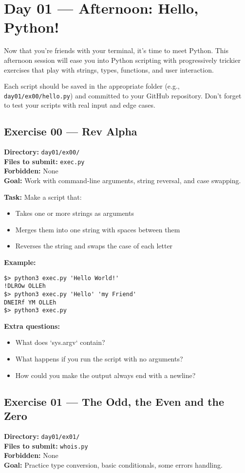 \documentclass[12pt,a4paper]{article}
\begin{document}
\newpage
\section{Day 01 — Afternoon: Hello, Python!}

Now that you're friends with your terminal, it's time to meet Python. This afternoon session will ease you into Python scripting with progressively trickier exercises that play with strings, types, functions, and user interaction.

Each script should be saved in the appropriate folder (e.g., \texttt{day01/ex00/hello.py}) and committed to your GitHub repository. Don't forget to test your scripts with real input and edge cases.

\newpage
\subsection*{Exercise 00 — Rev Alpha}
\textbf{Directory:} \texttt{day01/ex00/}\\
\textbf{Files to submit:} \texttt{exec.py}\\
\textbf{Forbidden:} None\\
\textbf{Goal:} Work with command-line arguments, string reversal, and case swapping.

\textbf{Task:} Make a script that:
\begin{itemize}
  \item Takes one or more strings as arguments
  \item Merges them into one string with spaces between them
  \item Reverses the string and swaps the case of each letter
\end{itemize}

\textbf{Example:}
\begin{lstlisting}
$> python3 exec.py 'Hello World!'
!DLROw OLLEh
$> python3 exec.py 'Hello' 'my Friend'
DNEIRf YM OLLEh
$> python3 exec.py
\end{lstlisting}

\textbf{Extra questions:}
\begin{itemize}
  \item What does `sys.argv` contain?
  \item What happens if you run the script with no arguments?
  \item How could you make the output always end with a newline?
\end{itemize}

\newpage
\subsection*{Exercise 01 — The Odd, the Even and the Zero}
\textbf{Directory:} \texttt{day01/ex01/}\\
\textbf{Files to submit:} \texttt{whois.py}\\
\textbf{Forbidden:} None\\
\textbf{Goal:} Practice type conversion, basic conditionals, some errors handling.
\end{document}
